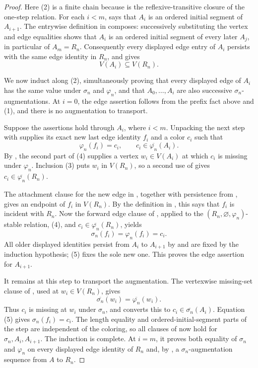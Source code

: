 \begin{proof}
Here (2) is a finite chain because
 is the reflexive-transitive closure
of the one-step relation.  For each $i<m$,
 says that $A_i$ is an ordered initial
segment of $A_{i+1}$.  The entrywise definition in
 composes: successively substituting
the vertex and edge equalities shows that $A_i$ is an ordered initial
segment of every later $A_j$, in particular of $A_m=R_n$.  Consequently
every displayed edge entry of $A_i$ persists with the same edge identity
in $R_n$, and  gives
\[
                  V(A_i)\subseteq V(R_n).                     \tag{3}
\]

We now induct along (2), simultaneously proving that every displayed edge
of $A_i$ has the same value under $\sigma_n$ and $\varphi_n$, and that
$A_0,\ldots,A_i$ are also successive $\sigma_n$-augmentations.  At
$i=0$, the edge assertion follows from the prefix fact above and (1), and
there is no augmentation to transport.

Suppose the assertions hold through $A_i$, where $i<m$.  Unpacking the
next step with  supplies its exact new last
edge identity $f_i$ and a color $c_i$ such that
\[
 \varphi_n(f_i)=c_i,
 \qquad c_i\in\overline{\varphi_n}(A_i).                       \tag{4}
\]
By , the second part of (4) supplies a vertex
$w_i\in V(A_i)$ at which $c_i$ is missing under $\varphi_n$.  Inclusion
(3) puts $w_i$ in $V(R_n)$, so a second use of
 gives
$c_i\in\overline{\varphi_n}(R_n)$.

The attachment clause for the new edge in
, together with persistence from
, gives an endpoint of $f_i$ in
$V(R_n)$.  By the definition in , this says
that $f_i$ is incident with $R_n$.  Now the forward edge clause of
, applied to the
$(R_n,\varnothing,\varphi_n)$-stable relation, (4), and
$c_i\in\overline{\varphi_n}(R_n)$, yields
\[
             \sigma_n(f_i)=\varphi_n(f_i)=c_i.                 \tag{5}
\]
All older displayed identities persist from $A_i$ to $A_{i+1}$ by
 and are fixed by the induction
hypothesis; (5) fixes the sole new one.  This proves the edge assertion
for $A_{i+1}$.

It remains at this step to transport the augmentation.  The vertexwise
missing-set clause of , used at
$w_i\in V(R_n)$, gives
\[
 \overline{\sigma_n}(w_i)=\overline{\varphi_n}(w_i).
\]
Thus $c_i$ is missing at $w_i$ under $\sigma_n$, and
 converts this to
$c_i\in\overline{\sigma_n}(A_i)$.  Equation (5) gives
$\sigma_n(f_i)=c_i$.  The length equality and ordered-initial-segment
parts of the step are independent of the coloring, so all clauses of
 now hold for
$\sigma_n,A_i,A_{i+1}$.  The induction is complete.  At $i=m$, it proves
both equality of $\sigma_n$ and $\varphi_n$ on every displayed edge
identity of $R_n$ and, by
, a $\sigma_n$-augmentation
sequence from $A$ to $R_n$.


\end{proof}
